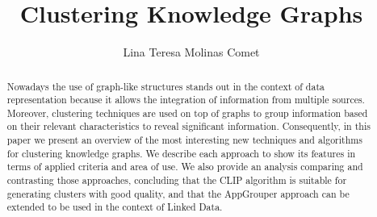 \documentclass[runningheads]{llncs}
\begin{document}
%
\title{Clustering Knowledge Graphs}
%
%
\author{Lina Teresa Molinas Comet}
%
%
%
\maketitle              %
%
\begin{abstract}
Nowadays the use of graph-like structures stands out in the context of data representation because it allows the integration of information from multiple sources. Moreover, clustering techniques are used on top of graphs to group information based on their relevant characteristics to reveal significant information. Consequently, in this paper we present an overview of the most interesting new techniques and algorithms for clustering knowledge graphs. We describe each approach to show its features in terms of applied criteria and area of use. We also provide an analysis comparing and contrasting those approaches, concluding that the CLIP algorithm is suitable for generating clusters with good quality, and that the AppGrouper approach can be extended to be used in the context of Linked Data.

\end{abstract}
%
%
%
\end{document}
